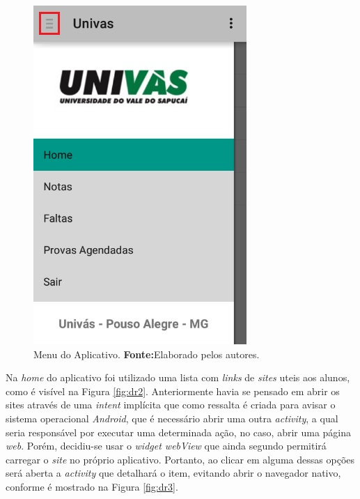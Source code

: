 \begin{figure}[h!]
	\centerline{\includegraphics[scale=0.5]{./imagens/3_discussao_resultados/dr1.png}}
	\caption[Menu do Aplicativo]{Menu do Aplicativo.
		\textbf{Fonte:}Elaborado pelos autores.}
	\label{fig:dr1}
\end{figure}
\pagebreak

	\par Na \textit{home} do aplicativo foi utilizado uma lista com \textit{links}
 de \textit{sites} uteis aos alunos, como é visível na Figura \ref{fig:dr2}.
 Anteriormente havia se pensado em abrir os sites através de uma
 \textit{intent} implícita que como ressalta  é criada
 para avisar o sistema operacional \textit{Android}, que é necessário abrir uma
 outra \textit{activity}, a qual seria responsável por executar uma determinada
 ação, no caso, abrir uma página \textit{web}. Porém, decidiu-se usar o
 \textit{widget webView} que ainda segundo  permitirá
 carregar o \textit{site} no próprio aplicativo. Portanto, ao clicar em alguma
 dessas opções será aberta a \textit{activity} que detalhará o item, evitando
 abrir o navegador nativo, conforme é mostrado na Figura \ref{fig:dr3}.

